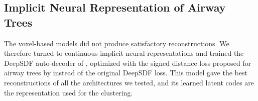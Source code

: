 %
%
%

\subsection[Implicit encoding]{Implicit Neural Representation of Airway Trees}
\label{sec:implicit}                     %
\label{sec:dgci}                         %

The voxel-based models did not produce satisfactory reconstructions. We therefore turned
to continuous implicit neural representations and trained the DeepSDF auto-decoder of
\citet{park2019}, optimized with the signed distance loss proposed for airway trees by
\citet{zhang2024} instead of the original DeepSDF loss. This model gave the best
reconstructions of all the architectures we tested, and its learned latent codes are the
representation used for the clustering.

